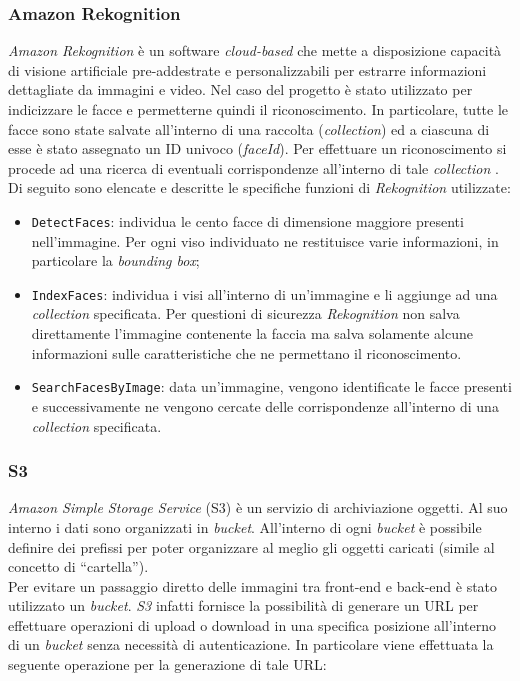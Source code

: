 	\subsubsection{Amazon Rekognition} \label{subsec:rekognition}
	
	\emph{Amazon Rekognition} è un software \emph{cloud-based} che mette a disposizione capacità di visione artificiale pre-addestrate e personalizzabili per estrarre informazioni dettagliate da immagini e video. Nel caso del progetto è stato utilizzato per indicizzare le facce e permetterne quindi il riconoscimento. In particolare, tutte le facce sono state salvate all'interno di una raccolta (\emph{collection}) ed a ciascuna di esse è stato assegnato un ID univoco (\emph{faceId}). Per effettuare un riconoscimento si procede ad una ricerca di eventuali corrispondenze all'interno di tale \emph{collection} . \\
	Di seguito sono elencate e descritte le specifiche funzioni di \emph{Rekognition} utilizzate:
	\begin{itemize}
		\item \texttt{DetectFaces}: individua le cento facce di dimensione maggiore presenti nell'immagine. Per ogni viso individuato ne restituisce varie informazioni, in particolare la \emph{bounding box};
		\item \texttt{IndexFaces}: individua i visi all'interno di un'immagine e li aggiunge ad una \emph{collection} specificata. Per questioni di sicurezza \emph{Rekognition} non salva direttamente l'immagine contenente la faccia ma salva solamente alcune informazioni sulle caratteristiche che ne permettano il riconoscimento.
		\item \texttt{SearchFacesByImage}: data un'immagine, vengono identificate le facce presenti e successivamente ne vengono cercate delle corrispondenze all'interno di una \emph{collection} specificata.
		
	\end{itemize} 
	
	\subsubsection{S3}
	\emph{Amazon Simple Storage Service} (S3) è un servizio di archiviazione oggetti. Al suo interno i dati sono organizzati in \emph{bucket}. All'interno di ogni \emph{bucket} è possibile definire dei prefissi per poter organizzare al meglio gli oggetti caricati (simile al concetto di ``cartella''). \\ 
	Per evitare un passaggio diretto delle immagini tra front-end e back-end è stato utilizzato un \emph{bucket}. \emph{S3} infatti fornisce la possibilità di generare un URL per effettuare operazioni di upload o download in una specifica posizione all'interno di un \emph{bucket} senza necessità di autenticazione. In particolare viene effettuata la seguente operazione per la generazione di tale URL:

